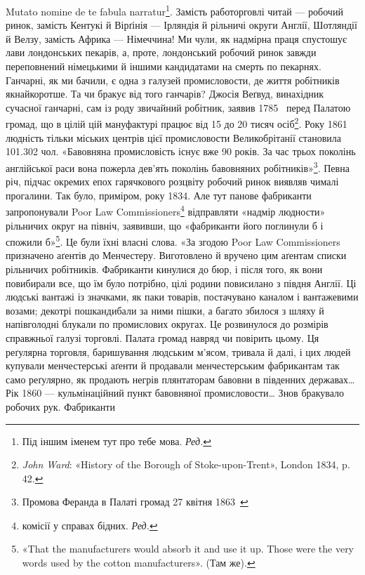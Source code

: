 Mutato nomine de te fabula narratur\footnote*{
Під іншим іменем тут про тебе мова. \emph{Ред.}
}.  Замість работорговлі
читай — робочий ринок, замість Кентукі й Вірґінія — Ірляндія
й рільничі округи Англії, Шотляндії й Велзу, замість Африка —
Німеччина! Ми чули, як надмірна праця спустошує лави лондонських
пекарів, а, проте, лондонський робочий ринок завжди
переповнений німецькими й іншими кандидатами на смерть по
пекарнях. Ганчарні, як ми бачили, є одна з галузей промисловости,
де життя робітників якнайкоротше. Та чи бракує від того ганчарів?
Джосія Веґвуд, винахідник сучасної ганчарні, сам із роду
звичайний робітник, заявив 1785~ перед Палатою громад,
що в цілій цій мануфактурі працює від 15 до 20 тисяч осіб\footnote{
\emph{John Ward}: «History of the Borough of Stoke-upon-Trent», London
1834, p. 42.
}.
Року 1861 людність тільки міських центрів цієї промисловости
Великобрітанії становила \num{101.302} чол. «Бавовняна промисловість
існує вже 90 років. За час трьох поколінь англійської раси
вона пожерла дев’ять поколінь бавовняних робітників»\footnote{
Промова Феранда в Палаті громад 27 квітня 1863~
}.
Певна річ, підчас окремих епох гарячкового розцвіту робочий
ринок виявляв чималі прогалини. Так було, приміром, року 1834.
Але тут панове фабриканти запропонували Poor Law Commissioners\footnote*{
комісії у справах бідних. \emph{Ред.}
}
відправляти «надмір людности» рільничих округ на північ,
заявивши, що «фабриканти його поглинули б і спожили б»\footnote{
«That the manufacturers would absorb it and use it up. Those were
the very words used by the cotton manufacturers». (Там же).
}.
Це були їхні власні слова. «За згодою Poor Law Commissioners
призначено аґентів до Менчестеру. Виготовлено й вручено цим
аґентам списки рільничих робітників. Фабриканти кинулися до
бюр, і після того, як вони повибирали все, що їм було потрібно,
цілі родини повисилано з півдня Англії. Ці людські вантажі із
значками, як паки товарів, постачувано каналом і вантажевими
возами; декотрі пошкандибали за ними пішки, а багато збилося
з шляху й напівголодні блукали по промислових округах. Це розвинулося
до розмірів справжньої галузі торговлі. Палата громад
навряд чи повірить цьому. Ця реґулярна торговля, баришування
людським м’ясом, тривала й далі, і цих людей купували менчестерські
аґенти й продавали менчестерським фабрикантам так
само реґулярно, як продають негрів плянтаторам бавовни в південних
державах\dots{} Рік 1860 — кульмінаційний пункт бавовняної
промисловости\dots{} Знов бракувало робочих рук. Фабриканти
